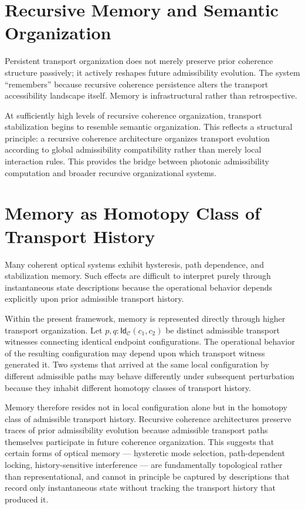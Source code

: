 \documentclass[11pt,openany]{book}
\theoremstyle{definition}
\theoremstyle{plain}
\newcommand{\idtype}{\mathsf{Id}}
\begin{document}
\section{Recursive Memory and Semantic Organization}

Persistent transport organization does not merely preserve prior coherence structure passively; it actively reshapes future admissibility evolution. The system ``remembers'' because recursive coherence persistence alters the transport accessibility landscape itself. Memory is infrastructural rather than retrospective.

At sufficiently high levels of recursive coherence organization, transport stabilization begins to resemble semantic organization. This reflects a structural principle: a recursive coherence architecture organizes transport evolution according to global admissibility compatibility rather than merely local interaction rules. This provides the bridge between photonic admissibility computation and broader recursive organizational systems.

\section{Memory as Homotopy Class of Transport History}

Many coherent optical systems exhibit hysteresis, path dependence, and stabilization memory. Such effects are difficult to interpret purely through instantaneous state descriptions because the operational behavior depends explicitly upon prior admissible transport history.

Within the present framework, memory is represented directly through higher transport organization. Let $p, q : \idtype_{\mathcal{C}}(c_1,c_2)$ be distinct admissible transport witnesses connecting identical endpoint configurations. The operational behavior of the resulting configuration may depend upon which transport witness generated it. Two systems that arrived at the same local configuration by different admissible paths may behave differently under subsequent perturbation because they inhabit different homotopy classes of transport history.

Memory therefore resides not in local configuration alone but in the homotopy class of admissible transport history. Recursive coherence architectures preserve traces of prior admissibility evolution because admissible transport paths themselves participate in future coherence organization. This suggests that certain forms of optical memory --- hysteretic mode selection, path-dependent locking, history-sensitive interference --- are fundamentally topological rather than representational, and cannot in principle be captured by descriptions that record only instantaneous state without tracking the transport history that produced it.
\end{document}

